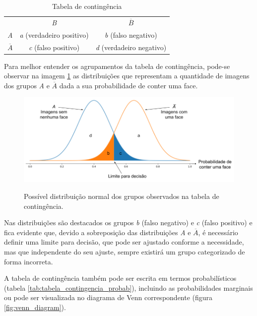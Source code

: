 \begin{table}[htbp]
    \caption{Tabela de contingência}
    \label{tab:tabela_contingencia}
    \centering
    \begin{tabular}{ccc}\hline\hline
        & \textit{B} & $\overline{B}$ \\
    \textit{A} & \textit{a} (verdadeiro positivo) & \textit{b} (falso negativo) \\
    $\overline{A}$ & \textit{c} (falso positivo) & \textit{d} (verdadeiro negativo) \\
    \hline\hline
    \end{tabular}
\end{table}

Para melhor entender os agrupamentos da tabela de contingência, pode-se observar na imagem \ref{fig:norm_dist} as distribuições que representam a quantidade de imagens dos grupos \textit{A} e $\overline{A}$ dada a sua probabilidade de conter uma face. 

\begin{figure}[htbp]
    \centering
    \caption{Possível distribuição normal dos grupos observados na tabela de contingência.}
    \includegraphics[scale=.5]{figs/norm_dist.png}
    \label{fig:norm_dist}
 \end{figure}

 Nas distribuições são destacados os grupos \textit{b} (falso negativo) e \textit{c} (falso positivo) e fica evidente que, devido a sobreposição das distribuições \textit{A} e $\overline{A}$, é necessário definir uma limite para decisão, que pode ser ajustado conforme a necessidade, mas que independente do seu ajuste, sempre existirá um grupo categorizado de forma incorreta.

 A tabela de contingência também pode ser escrita em termos probabilísticos (tabela \ref{tab:tabela_contingencia_probab}), incluindo as probabilidades marginais ou pode ser visualizada no diagrama de Venn correspondente (figura \ref{fig:venn_diagram}).

